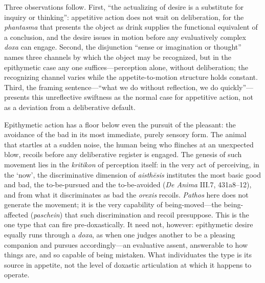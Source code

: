 Three observations follow. First, ``the actualizing of desire is a substitute for inquiry or thinking'': appetitive action does not wait on deliberation, for the \textit{phantasma} that presents the object as drink supplies the functional equivalent of a conclusion, and the desire issues in motion before any evaluatively complex \textit{doxa} can engage. Second, the disjunction ``sense or imagination or thought'' names three channels by which the object may be recognized, but in the epithymetic case any one suffices---perception alone, without deliberation; the recognizing channel varies while the appetite-to-motion structure holds constant. Third, the framing sentence---``what we do without reflection, we do quickly''---presents this unreflective swiftness as the normal case for appetitive action, not as a deviation from a deliberative default.

Epithymetic action has a floor below even the pursuit of the pleasant: the avoidance of the bad in its most immediate, purely sensory form. The animal that startles at a sudden noise, the human being who flinches at an unexpected blow, recoils before any deliberative register is engaged. The genesis of such movement lies in the \textit{kritikon} of perception itself: in the very act of perceiving, in the `now', the discriminative dimension of \textit{aisthēsis} institutes the most basic good and bad, the to-be-pursued and the to-be-avoided (\textit{De Anima} III.7, 431a8--12), and from what it discriminates as bad the \textit{orexis} recoils. \textit{Pathos} here does not generate the movement; it is the very capability of being-moved---the being-affected (\textit{paschein}) that such discrimination and recoil presuppose. This is the one type that can fire pre-doxastically. It need not, however: epithymetic desire equally runs through a \textit{doxa}, as when one judges another to be a pleasing companion and pursues accordingly---an evaluative assent, answerable to how things are, and so capable of being mistaken. What individuates the type is its source in appetite, not the level of doxastic articulation at which it happens to operate.

